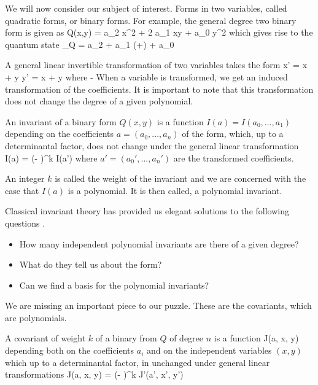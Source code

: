 We will now consider our subject of interest.  Forms in two variables, called quadratic forms, or binary forms.  
For example, the general degree two binary form is given as  
\be 
Q(x,y) = a_2 x^2 + 2 a_1 xy + a_0 y^2
\ee 
which gives rise to the quantum state 
\be 
\psi_Q = a_2 + a_1 (+) + a_0 
\ee 

\begin{definition}
 A general linear invertible transformation of two variables takes the form 
 \be 
 x' = \alpha x + \beta y
 \ee 
 \be 
 y' = \gamma x + \delta y
 \ee 
 where 
 \be 
 \alpha \delta - \beta \gamma {}
 \ee 
 When a variable is transformed, we get an induced transformation of the coefficients.  It is important to note that this transformation does not change the degree of a given polynomial.  
\end{definition}

\begin{definition}
 An invariant of a binary form $Q(x,y)$ is a function $I(a) = I(a_0, ..., a_1)$ depending on the coefficients 
 $a= (a_0, ..., a_n)$ of the form, which, up to a determinantal factor, does not change under the general linear 
 transformation 
 \be 
 I(a) = (\alpha \delta - \beta \gamma)^k I(a')
 \ee 
 where $a' = (a_0', ..., a_n')$ are the transformed coefficients.  
\end{definition}

An integer $k$ is called the weight of the invariant and we are concerned with the case that $I(a)$ is a polynomial.  
It is then called, a polynomial invariant.  

\begin{remark}
 Classical invariant theory has provided us elegant solutions to the following questions \cite{hilbert, oliver}.  
 \begin{itemize}
  \item[(i)] How many independent polynomial invariants are there of a given degree?
  \item[(ii)] What do they tell us about the form? 
  \item[(iii)] Can we find a basis for the polynomial invariants? 
 \end{itemize}
\end{remark}

We are missing an important piece to our puzzle.  These are the covariants, which are polynomials.  

\begin{definition}
 A covariant of weight $k$ of a binary from $Q$ of degree $n$ is a function 
 \be 
 J(a, x, y)
 \ee 
 depending both on the coefficients $a_i$ and on the independent variables $(x,y)$ which up to a determinantal factor, in unchanged under general linear transformations 
 \be 
 J(a, x, y) =  (\alpha \delta - \beta \gamma)^k J'(a', x', y')
 \ee 
\end{definition}



